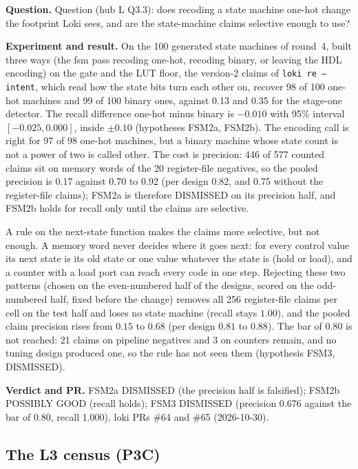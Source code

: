 \documentclass[conference]{IEEEtran}
\newcommand{\hev}[1]{\par\smallskip\noindent\textbf{#1}}
\newcommand{\code}[1]{\texttt{#1}}
\begin{document}
\hev{Question.} Question (hub L Q3.3): does recoding a state machine one-hot change the footprint Loki sees, and are the state-machine claims selective enough to use?

\hev{Experiment and result.} On the 100 generated state machines of round~4, built three ways (the fsm pass
recoding one-hot, recoding binary, or leaving the HDL encoding) on the gate and the LUT floor, the version-2 claims of
\code{loki re --intent}, which read how the state bits turn each other on, recover 98 of 100 one-hot machines and 99 of
100 binary ones, against 0.13 and 0.35 for the stage-one detector. The recall difference one-hot minus binary is
$-0.010$ with 95\% interval $[-0.025,0.000]$, inside $\pm0.10$ (hypotheses FSM2a, FSM2b). The encoding call is right for
97 of 98 one-hot machines, but a binary machine whose state count is not a power of two is called other. The cost is
precision: 446 of 577 counted claims sit on memory words of the 20 register-file negatives, so the pooled precision is
0.17 against 0.70 to 0.92 (per design 0.82, and 0.75 without the register-file claims); FSM2a is therefore
DISMISSED on its precision half, and FSM2b holds for recall only until the claims are selective.

A rule on the next-state function makes the claims more selective, but not enough. A memory word never decides
where it goes next: for every control value its next state is its old state or one value whatever the state is
(hold or load), and a counter with a load port can reach every code in one step. Rejecting these two patterns
(chosen on the even-numbered half of the designs, scored on the odd-numbered half, fixed before the change) removes all
256 register-file claims per cell on the test half and loses no state machine (recall stays $1.00$), and the pooled
claim precision rises from $0.15$ to $0.68$ (per design $0.81$ to $0.88$). The bar of $0.80$ is not reached:
21 claims on pipeline negatives and 3 on counters remain, and no tuning design produced one, so the rule has not
seen them (hypothesis FSM3, DISMISSED).

\hev{Verdict and PR.} FSM2a DISMISSED (the precision half is falsified); FSM2b POSSIBLY GOOD (recall holds); FSM3 DISMISSED (precision 0.676 against the bar of 0.80, recall 1.000). loki PRs \#64 and \#65 (2026-10-30).

\subsection{The L3 census (P3C)}
\label{rec:census}
\end{document}
